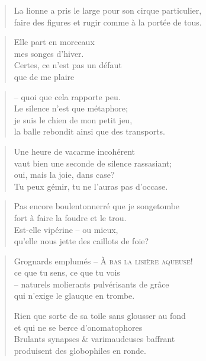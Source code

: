   \begin{verse}
    La lionne a pris le large pour son cirque particulier,\\
    faire des figures et rugir comme à la portée de tous.
  \end{verse}
  \begin{verse}
    Elle part en morceaux\\
    mes songes d’hiver.\\
    Certes, ce n’est pas un défaut\\
    que de me plaire
  \end{verse}
  \begin{verse}
    -- quoi que cela rapporte peu.\\
    Le silence n’est que métaphore;\\
    je suis le chien de mon petit jeu,\\
    la balle rebondit ainsi que des transports.
  \end{verse}
  \begin{verse}
    Une heure de vacarme incohérent\\
    vaut bien une seconde de silence rassasiant;\\
    oui, mais la joie, dans case?\\
    Tu peux gémir, tu ne l’auras pas d’occase.
  \end{verse}
  \begin{verse}
    Pas encore boulentonnerré que je songetombe\\
    fort à faire la foudre et le trou.\\
    Est-elle vipérine -- ou mieux,\\
    qu’elle nous jette des caillots de foie?
  \end{verse}
  \begin{verse}
    Grognards emplumés -- \textsc{À bas la lisière aqueuse!}\\
    ce que tu sens, ce que tu vois\\
    -- naturels molierants pulvérisants de grâce\\
    qui n’exige le glauque en trombe.

    Rien que sorte de sa toile sans glousser au fond\\
    et qui ne se berce d’onomatophores\\
    Brulants synapses \& varimaudeuses baffrant\\
    produisent des globophiles en ronde.
  \end{verse}

